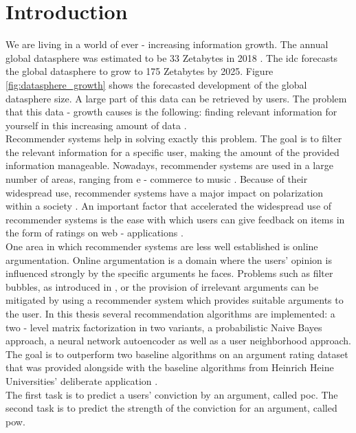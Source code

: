 \listoffigures
\listoftables
{}
\printglossary[type=\acronymtype, nonumberlist, style=alttree, nogroupskip=true]

\section{Introduction}
We are living in a world of ever - increasing information growth. The annual global datasphere was estimated to be 33 Zetabytes in 2018 \cite{rydning2018digitization}. The \acrfull{idc} forecasts the global datasphere to grow to 175 Zetabytes by 2025. Figure \ref{fig:datasphere_growth} shows the forecasted development of the global datasphere size. A large part of this data can be retrieved by users. The problem that this data - growth causes is the following: finding relevant information for yourself in this increasing amount of data \cite{burke2011recommender}.\\Recommender systems help in solving exactly this problem. The goal is to filter the relevant information for a specific user, making the amount of the provided information manageable.
Nowadays, recommender systems are used in a large number of areas, ranging from e - commerce to music \cite{kumar2021recommender}. Because of their widespread use, recommender systems have a major impact on polarization within a society \cite{stray2021designing}.
An important factor that accelerated the widespread use of recommender systems is the ease with which users can give feedback on items in the form of ratings on web - applications \cite{aggarwal2016recommender}.\\
One area in which recommender systems are less well established is online argumentation. Online argumentation is a domain where the users' opinion is influenced strongly by the specific arguments he faces. Problems such as filter bubbles, as introduced in \cite{pariser2011filter}, or the provision of irrelevant arguments can be mitigated by using a recommender system
which provides suitable arguments to the user.
In this thesis several recommendation algorithms are implemented: a two - level matrix factorization in two variants, a probabilistic Naive Bayes approach, a neural network autoencoder as well as a user neighborhood approach. The goal is to outperform two baseline algorithms on an argument rating dataset that was provided alongside with the baseline algorithms from Heinrich Heine Universities' deliberate application \cite{brenneis2020deliberate}.\\
The first task is to predict a users' conviction by an argument, called \acrfull{poc}. The second task is to predict the strength of the conviction for an argument, called \acrfull{pow}.\\

